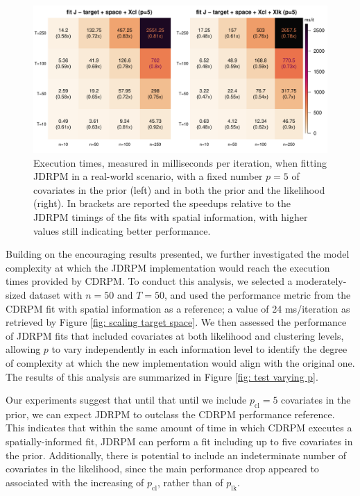 \documentclass[12pt,	%
	a4paper,		%
	twoside,		%
	openright,		%
	titlepage,%
	]{book}
\theoremstyle{definition}
\begin{document}
\begin{figure}[!ht]
    \centering
    \includegraphics[width=1\linewidth]{Testing/Scaling possibilities/target_space_covariates.pdf}
    \caption[Execution times of JDRPM, with covariates information, fixed $p$]{Execution times, measured in milliseconds per iteration, when fitting JDRPM in a real-world scenario, with a fixed number $p=5$ of covariates in the prior (left) and in both the prior and the likelihood (right). In brackets are reported the speedups relative to the JDRPM timings of the fits with spatial information, with higher values still indicating better performance.}
    \label{fig: scaling target space covariates}
\end{figure}


Building on the encouraging results presented, we further investigated the model complexity at which the JDRPM implementation would reach the execution times provided by CDRPM. To conduct this analysis, we selected a moderately-sized dataset with $n=50$ and $T=50$, and used the performance metric from the CDRPM fit with spatial information as a reference; a value of 24 ms/iteration as retrieved by Figure \ref{fig: scaling target space}. We then assessed the performance of JDRPM fits that included covariates at both likelihood and clustering levels, allowing $p$ to vary independently in each information level to identify the degree of complexity at which the new implementation would align with the original one. The results of this analysis are summarized in Figure \ref{fig: test varying p}. 

Our experiments suggest that until that until we include $p_\text{cl}=5$ covariates in the prior, we can expect JDRPM to outclass the CDRPM performance reference. This indicates that within the same amount of time in which CDRPM executes a spatially-informed fit, JDRPM can perform a fit including up to five covariates in the prior. Additionally, there is potential to include an indeterminate number of covariates in the likelihood, since the main performance drop appeared to associated with the increasing of $p_\text{cl}$, rather than of $p_\text{lk}$.
\end{document}
